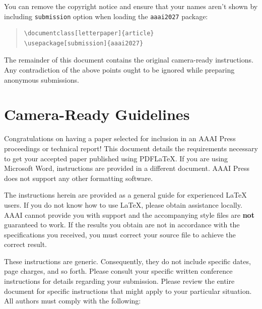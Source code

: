 You can remove the copyright notice and ensure that your names aren't shown by including \texttt{submission} option when loading the \texttt{aaai2027} package:

\begin{quote}\begin{scriptsize}\begin{verbatim}
\documentclass[letterpaper]{article}
\usepackage[submission]{aaai2027}
\end{verbatim}\end{scriptsize}\end{quote}

The remainder of this document contains the original camera-ready instructions. Any contradiction of the above points ought to be ignored while preparing anonymous submissions.

\section{Camera-Ready Guidelines}

Congratulations on having a paper selected for inclusion in an AAAI Press proceedings or technical report! This document details the requirements necessary to get your accepted paper published using PDF\LaTeX{}. If you are using Microsoft Word, instructions are provided in a different document. AAAI Press does not support any other formatting software.

The instructions herein are provided as a general guide for experienced \LaTeX{} users. If you do not know how to use \LaTeX{}, please obtain assistance locally. AAAI cannot provide you with support and the accompanying style files are \textbf{not} guaranteed to work. If the results you obtain are not in accordance with the specifications you received, you must correct your source file to achieve the correct result.

These instructions are generic. Consequently, they do not include specific dates, page charges, and so forth. Please consult your specific written conference instructions for details regarding your submission. Please review the entire document for specific instructions that might apply to your particular situation. All authors must comply with the following:

